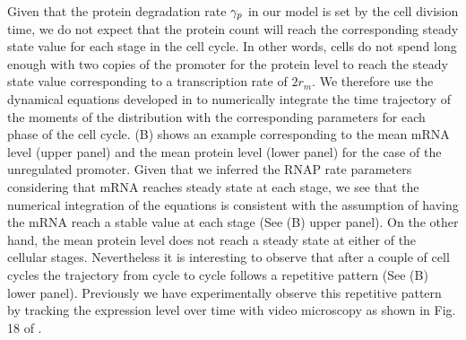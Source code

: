 Given that the protein degradation rate $\gamma _p$ in our model is set by the cell
division time, we do not expect that the protein count will reach the
corresponding steady state value for each stage in the cell cycle. In other
words, cells do not spend long enough with two copies of the promoter for the
protein level to reach the steady state value corresponding to a transcription
rate of $2 r_m$. We therefore use the dynamical equations developed in
 to numerically integrate the time trajectory of the moments
of the distribution with the corresponding parameters for each phase of the cell
cycle. (B) shows an example corresponding to the mean mRNA
level (upper panel) and the mean protein level (lower panel) for the case of the
unregulated promoter. Given that we inferred the RNAP rate parameters
considering that mRNA reaches steady state at each stage, we see that the
numerical integration of the equations is consistent with the assumption of
having the mRNA reach a stable value at each stage (See
(B) upper panel). On the other hand, the mean protein
level does not reach a steady state at either of the cellular stages.
Nevertheless it is interesting to observe that after a couple of cell cycles the
trajectory from cycle to cycle follows a repetitive pattern (See
(B) lower panel). Previously we have experimentally
observe this repetitive pattern by tracking the expression level over time with
video microscopy as shown in Fig. 18 of \cite{Phillips2019}.

